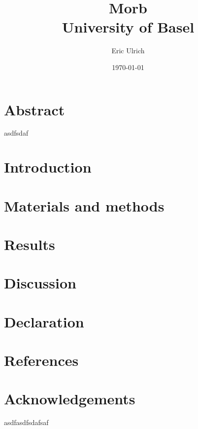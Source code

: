 \documentclass[12pt,twoside]{report}
\title{
    {Morb}\\
    {\large University of Basel}
}
\author{Eric Ulrich}
\date{\today}
\begin{document}
\maketitle

\pagestyle{empty} %
\tableofcontents


\chapter{Abstract}

asdfsdaf

\chapter{Introduction}



\chapter{Materials and methods}


\chapter{Results}


\chapter{Discussion}


\chapter{Declaration}


\chapter{References}

\printbibliography


\chapter{Acknowledgements}
asdfasdfsdafsaf
\end{document}
